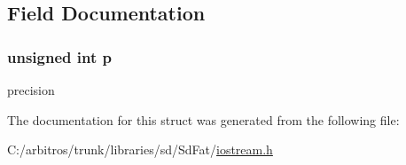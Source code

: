 \subsection{Field Documentation}
\hypertarget{structsetprecision_a792fef4919ad545581902926c8d43b60}{
\subsubsection[{p}]{\setlength{\rightskip}{0pt plus 5cm}unsigned int p}}\label{structsetprecision_a792fef4919ad545581902926c8d43b60}
precision 

The documentation for this struct was generated from the following file\-:\begin{DoxyCompactItemize}
\item 
C\-:/arbitros/trunk/libraries/sd/\-Sd\-Fat/\hyperlink{iostream_8h}{iostream.\-h}\end{DoxyCompactItemize}
